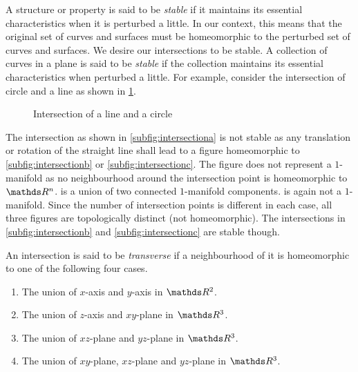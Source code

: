 A structure or property is said to be \textit{stable} if it maintains its essential characteristics when it is perturbed a little. In our context, this means that the original set of curves and surfaces must be homeomorphic to the perturbed set of curves and surfaces. We desire our intersections to be stable. A collection of curves in a plane is said to be \textit{stable} if the collection maintains its essential characteristics when perturbed a little. For example, consider the intersection of circle and a line as shown in \cref{fig:intersectionoflineandcircle}.

\begin{figure}
    \centering
    \subcaptionbox{\label{subfig:intersectiona}}{\CWL}\quad\quad
    \subcaptionbox{\label{subfig:intersectionb}}{\CWLO}\quad\quad
    \subcaptionbox{\label{subfig:intersectionc}}{\CWLI}
    \caption{Intersection of a line and a circle}\label{fig:intersectionoflineandcircle}
\end{figure}

The intersection as shown in \cref{subfig:intersectiona} is not stable as any translation or rotation of the straight line shall lead to a figure homeomorphic to \cref{subfig:intersectionb} or \cref{subfig:intersectionc}. The figure does not represent a \(1\)-manifold as no neighbourhood around the intersection point is homeomorphic to \(\R^n\).  is a union of two connected \(1\)-manifold components.  is again not a \(1\)-manifold. Since the number of intersection points is different in each case, all three figures are topologically distinct (not homeomorphic). The intersections in \cref{subfig:intersectionb} and \cref{subfig:intersectionc} are stable though.

\begin{defn}
    An intersection is said to be \textit{transverse} if a neighbourhood of it is homeomorphic to one of the following four cases.
    \begin{enumerate}
        \item The union of \(x\)-axis and \(y\)-axis in \(\R^2\).
        \item The union of \(z\)-axis and \(xy\)-plane in \(\R^3\).
        \item The union of \(xz\)-plane and \(yz\)-plane in \(\R^3\).
        \item The union of \(xy\)-plane, \(xz\)-plane and \(yz\)-plane in \(\R^3\).
    \end{enumerate}
\end{defn}


